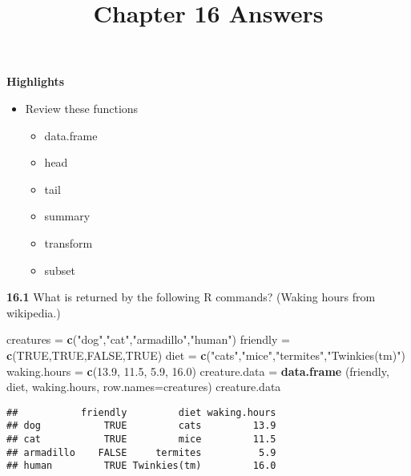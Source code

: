 \documentclass[]{article}
\title{Chapter 16 Answers}
\author{}
\date{}
\newenvironment{Shaded}{\begin{snugshade}}{\end{snugshade}}
\newcommand{\KeywordTok}[1]{\textcolor[rgb]{0.13,0.29,0.53}{\textbf{#1}}}
\newcommand{\DataTypeTok}[1]{\textcolor[rgb]{0.13,0.29,0.53}{#1}}
\newcommand{\FloatTok}[1]{\textcolor[rgb]{0.00,0.00,0.81}{#1}}
\newcommand{\StringTok}[1]{\textcolor[rgb]{0.31,0.60,0.02}{#1}}
\newcommand{\OtherTok}[1]{\textcolor[rgb]{0.56,0.35,0.01}{#1}}
\newcommand{\NormalTok}[1]{#1}
\providecommand{\tightlist}{%
  \setlength{\itemsep}{0pt}\setlength{\parskip}{0pt}}
\begin{document}
\maketitle


\textbf{Highlights}

\begin{itemize}
\tightlist
\item
  Review these functions

  \begin{itemize}
  \tightlist
  \item
    data.frame
  \item
    head
  \item
    tail
  \item
    summary
  \item
    transform
  \item
    subset
  \end{itemize}
\end{itemize}

\textbf{16.1} What is returned by the following R commands? (Waking
hours from wikipedia.)

\begin{Shaded}
\begin{Highlighting}[]
\NormalTok{creatures =}\StringTok{ }\KeywordTok{c}\NormalTok{(}\StringTok{"dog"}\NormalTok{,}\StringTok{"cat"}\NormalTok{,}\StringTok{"armadillo"}\NormalTok{,}\StringTok{"human"}\NormalTok{)}
\NormalTok{friendly =}\StringTok{ }\KeywordTok{c}\NormalTok{(}\OtherTok{TRUE}\NormalTok{,}\OtherTok{TRUE}\NormalTok{,}\OtherTok{FALSE}\NormalTok{,}\OtherTok{TRUE}\NormalTok{)}
\NormalTok{diet =}\StringTok{ }\KeywordTok{c}\NormalTok{(}\StringTok{"cats"}\NormalTok{,}\StringTok{"mice"}\NormalTok{,}\StringTok{"termites"}\NormalTok{,}\StringTok{"Twinkies(tm)"}\NormalTok{)}
\NormalTok{waking.hours =}\StringTok{ }\KeywordTok{c}\NormalTok{(}\FloatTok{13.9}\NormalTok{, }\FloatTok{11.5}\NormalTok{, }\FloatTok{5.9}\NormalTok{, }\FloatTok{16.0}\NormalTok{)}
\NormalTok{creature.data =}\StringTok{ }\KeywordTok{data.frame}\NormalTok{ (friendly, diet, waking.hours, }\DataTypeTok{row.names=}\NormalTok{creatures)}
\NormalTok{creature.data}
\end{Highlighting}
\end{Shaded}

\begin{verbatim}
##           friendly         diet waking.hours
## dog           TRUE         cats         13.9
## cat           TRUE         mice         11.5
## armadillo    FALSE     termites          5.9
## human         TRUE Twinkies(tm)         16.0
\end{verbatim}
\end{document}

